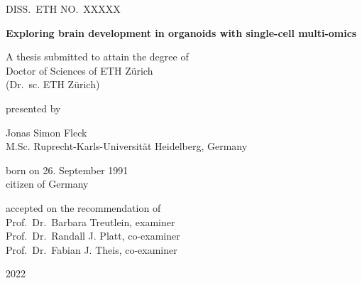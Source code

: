\begin{titlepage}
\centering

{DISS.\ ETH NO.\ XXXXX}\\

\vspace{2cm}

{\bfseries\sffamily\LARGE
Exploring brain development in organoids with single-cell multi-omics
}

\vspace{2cm}

{\large A thesis submitted to attain the degree of}\\
{\sc \large Doctor of Sciences} {\large of} {\sc \large ETH Zürich}\\
{\large(Dr.\ sc. ETH Zürich)}\\


\vspace{1cm}

{\large presented by}\\

\vspace{0.3cm}

{\sc \large Jonas Simon Fleck}\\
{\large M.Sc. Ruprecht-Karls-Universität Heidelberg, Germany\\}

\vspace{1cm}

{\large 
born on 26. September 1991\\
citizen of Germany\\
}

\vspace{2cm}

{\large
accepted on the recommendation of\\
Prof.\ Dr.\ Barbara Treutlein, examiner\\
Prof.\ Dr.\ Randall J. Platt, co-examiner\\
Prof.\ Dr.\ Fabian J. Theis, co-examiner\\
}

\vspace{2cm}

{\large
2022
}
	
\end{titlepage}